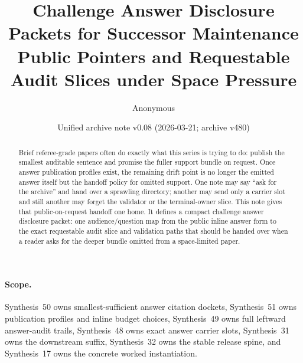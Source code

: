 \documentclass[11pt]{article}
\title{Challenge Answer Disclosure Packets for Successor Maintenance\\\large Public Pointers and Requestable Audit Slices under Space Pressure}
\author{Anonymous}
\date{Unified archive note v0.08 (2026-03-21; archive v480)}
\begin{document}
\maketitle

\begin{abstract}
Brief referee-grade papers often do exactly what this series is trying to do: publish the smallest auditable sentence and promise the fuller support bundle on request. Once answer publication profiles exist, the remaining drift point is no longer the emitted answer itself but the handoff policy for omitted support. One note may say ``ask for the archive'' and hand over a sprawling directory; another may send only a carrier slot and still another may forget the validator or the terminal-owner slice. This note gives that public-on-request handoff one home. It defines a compact challenge answer disclosure packet: one audience/question map from the public inline answer form to the exact requestable audit slice and validation paths that should be handed over when a reader asks for the deeper bundle omitted from a space-limited paper.
\end{abstract}

\paragraph{Scope.}
Synthesis~50 owns smallest-sufficient answer citation dockets, Synthesis~51 owns publication profiles and inline budget choices, Synthesis~49 owns full leftward answer-audit trails, Synthesis~48 owns exact answer carrier slots, Synthesis~31 owns the downstream suffix, Synthesis~32 owns the stable release spine, and Synthesis~17 owns the concrete worked instantiation.\cite{series:challengeanswercitationdockets,series:challengeanswerpublicationprofiles,series:challengeansweraudittrails,series:challengeanswercarrierslots,series:downstreamnormalforms,series:releasespine,series:workedexample}
\end{document}
